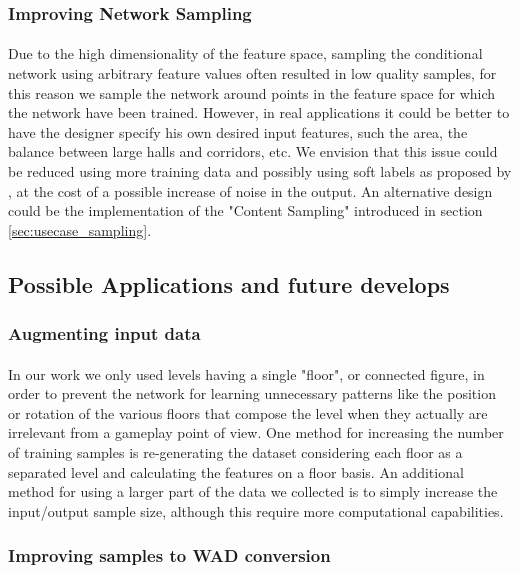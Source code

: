 \subsubsection{Improving Network Sampling}
\label{sec:sampling}
\paragraph{} Due to the high dimensionality of the feature space, sampling the conditional network using arbitrary feature values often resulted in low quality samples, for this reason we sample the network around points in the feature space for which the network have been trained. However, in real applications it could be better to have the designer specify his own desired input features, such the area, the balance between large halls and corridors, etc. We envision that this issue could be reduced using more training data and possibly using soft labels as proposed by \cite{improved_gan}, at the cost of a possible increase of noise in the output. An alternative design could be the implementation of the "Content Sampling" introduced in section \ref{sec:usecase_sampling}.

\subsection{Possible Applications and future develops}
\subsubsection{Augmenting input data}
\label{sec:data-augmentation}
\paragraph{} In our work we only used levels having a single "floor", or connected figure, in order to prevent the network for learning unnecessary patterns like the position or rotation of the various floors that compose the level when they actually are irrelevant from a gameplay point of view. One method for increasing the number of training samples is re-generating the dataset considering each floor as a separated level and calculating the features on a floor basis. An additional method for using a larger part of the data we collected is to simply increase the input/output sample size, although this require more computational capabilities. 

\subsubsection{Improving samples to WAD conversion}
